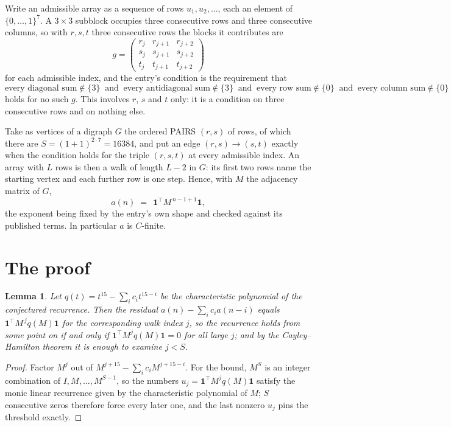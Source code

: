 \documentclass[11pt,a4paper]{article}
\theoremstyle{plain}
\newtheorem{lemma}[theorem]{Lemma}
\theoremstyle{definition}
\begin{document}
Write an admissible array as a sequence of rows $u_1,u_2,\dots$, each an element of
$\{0,\dots,1\}^{7}$. A $3\times3$ subblock occupies three consecutive rows and
three consecutive columns, so with $r,s,t$ three consecutive rows the blocks it
contributes are
\[
g=\begin{pmatrix}r_j&r_{j+1}&r_{j+2}\\ s_j&s_{j+1}&s_{j+2}\\ t_j&t_{j+1}&t_{j+2}\end{pmatrix}
\]
for each admissible index, and the entry's condition is the requirement that
\[
\text{every diagonal sum} \notin \{3\}\ \text{ and }\ \text{every antidiagonal sum} \notin \{3\}\ \text{ and }\ \text{every row sum} \notin \{0\}\ \text{ and }\ \text{every column sum} \notin \{0\}
\]
holds for no such $g$. This involves $r$, $s$ and $t$ only: it is a condition on
three consecutive rows and on nothing else.

Take as vertices of a digraph $G$ the ordered PAIRS $(r,s)$ of rows, of which there are
$S=(1+1)^{2\cdot7}=16384$, and put an edge $(r,s)\to(s,t)$ exactly when the condition
holds for the triple $(r,s,t)$ at every admissible index. An array with $L$ rows is then a
walk of length $L-2$ in $G$: its first two rows name the starting vertex and each further
row is one step. Hence, with $M$ the adjacency matrix of $G$,
\[
a(n)\;=\;\,\mathbf{1}^{\!\top}M^{\,n-1+1}\mathbf{1},
\]
the exponent being fixed by the entry's own shape and checked against its published terms.
In particular $a$ is $C$-finite.

\section{The proof}

\begin{lemma}\label{lem:crit}
Let $q(t)=t^{15}-\sum_i c_it^{15-i}$ be the characteristic polynomial of the
conjectured recurrence. Then the residual $a(n)-\sum_ic_ia(n-i)$ equals
$\mathbf{1}^{\!\top}M^{\,j}q(M)\mathbf{1}$ for the corresponding walk index
$j$, so the recurrence holds from some point on if and only if
$\mathbf{1}^{\!\top}M^{j}q(M)\mathbf{1}=0$ for all large $j$; and by the
Cayley--Hamilton theorem it is enough to examine $j<S$.
\end{lemma}

\begin{proof}
Factor $M^{j}$ out of $M^{j+15}-\sum_ic_iM^{j+15-i}$. For the bound, $M^{S}$
is an integer combination of $I,M,\dots,M^{S-1}$, so the numbers
$u_j=\mathbf{1}^{\!\top}M^{j}q(M)\mathbf{1}$ satisfy the monic linear recurrence given by
the characteristic polynomial of $M$; $S$ consecutive zeros therefore force every later one,
and the last nonzero $u_j$ pins the threshold exactly.
\end{proof}
\end{document}
